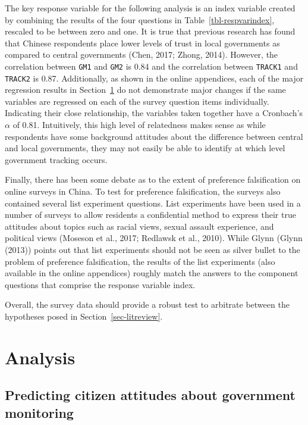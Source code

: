 \documentclass[
  letterpaper,
  DIV=11,
  numbers=noendperiod]{scrartcl}
\begin{document}
The key response variable for the following analysis is an index
variable created by combining the results of the four questions in
Table~\ref{tbl-respvarindex}, rescaled to be between zero and one. It is
true that previous research has found that Chinese respondents place
lower levels of trust in local governments as compared to central
governments (Chen, 2017; Zhong, 2014). However, the correlation between
\texttt{GM1} and \texttt{GM2} is 0.84 and the correlation between
\texttt{TRACK1} and \texttt{TRACK2} is 0.87. Additionally, as shown in
the online appendices, each of the major regression results in
Section~\ref{sec-analysis} do not demonstrate major changes if the same
variables are regressed on each of the survey question items
individually. Indicating their close relationship, the variables taken
together have a Cronbach's \(\alpha\) of 0.81. Intuitively, this high
level of relatedness makes sense as while respondents have some
background attitudes about the difference between central and local
governments, they may not easily be able to identify at which level
government tracking occurs.

Finally, there has been some debate as to the extent of preference
falsification on online surveys in China. To test for preference
falsification, the surveys also contained several list experiment
questions. List experiments have been used in a number of surveys to
allow residents a confidential method to express their true attitudes
about topics such as racial views, sexual assault experience, and
political views (Moseson et al., 2017; Redlawsk et al., 2010). While
Glynn (Glynn (2013)) points out that list experiments should not be seen
as silver bullet to the problem of preference falsification, the results
of the list experiments (also available in the online appendices)
roughly match the answers to the component questions that comprise the
response variable index.

Overall, the survey data should provide a robust test to arbitrate
between the hypotheses posed in Section~\ref{sec-litreview}.

\section{Analysis}\label{sec-analysis}

\subsection{Predicting citizen attitudes about government
monitoring}\label{predicting-citizen-attitudes-about-government-monitoring}
\end{document}
